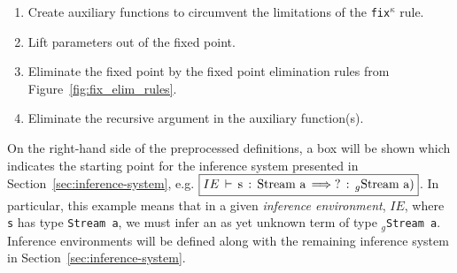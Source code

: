
\begin{enumerate}
\item Create auxiliary functions to circumvent the limitations of the
  \texttt{fix$^\kappa$} rule.
\item Lift parameters out of the fixed point.
\item Eliminate the fixed point by the fixed point elimination rules from
  Figure~\ref{fig:fix_elim_rules}.
\item Eliminate the recursive argument in the auxiliary function(s).
\end{enumerate}

\newcommand{\prepend}[5]{\ensuremath{{\boxed{IE\,\vdash\,\text{#4}\,:\,\text{#5}\,\infer
        \text{?}\,:\,_{g}\text{#5})}}}}
\newcommand{\prependm}[5]{\ensuremath{{\boxed{
            \begin{matrix*}[l] IE\,\vdash \\
                           \quad\text{#4}\,:\,\text{#5}\,\infer\,\text{?}\,:\,_{g}\text{#5})
            \end{matrix*}
            }}}}
\newcommand{\changed}[1]{\ensuremath{\fcolorbox{gray}{light-gray}{a rec}}}

On the right-hand side of the preprocessed definitions, a box will be shown
which indicates the starting point for the inference system presented in
Section~\ref{sec:inference-system},
e.g. \prepend{\text{prepend}}{\text{prepend}}{\,_{g}\text{prepend}}{s}{Stream
  a}. In particular, this example means that in a given \emph{inference
  environment}, $IE$, where \texttt{s} has type \texttt{Stream a}, we must infer
an as yet unknown term of type \texttt{$_g$Stream a}. Inference environments will
be defined along with the remaining inference system in
Section~\ref{sec:inference-system}. 

